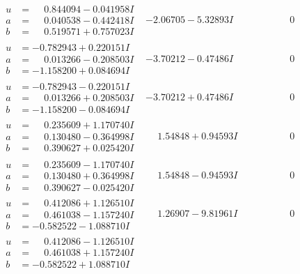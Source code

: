 \documentclass[1p]{elsarticle_modified}
\theoremstyle{definition}
\begin{document}
$$\begin{array}{c|c|c}
\begin{aligned}
u &= \phantom{-}0.844094 - 0.041958 I \\
a &= \phantom{-}0.040538 - 0.442418 I \\
b &= \phantom{-}0.519571 + 0.757023 I\end{aligned}
 & -2.06705 - 5.32893 I & \phantom{-0.000000 } 0 \\ \hline\begin{aligned}
u &= -0.782943 + 0.220151 I \\
a &= \phantom{-}0.013266 - 0.208503 I \\
b &= -1.158200 + 0.084694 I\end{aligned}
 & -3.70212 - 0.47486 I & \phantom{-0.000000 } 0 \\ \hline\begin{aligned}
u &= -0.782943 - 0.220151 I \\
a &= \phantom{-}0.013266 + 0.208503 I \\
b &= -1.158200 - 0.084694 I\end{aligned}
 & -3.70212 + 0.47486 I & \phantom{-0.000000 } 0 \\ \hline\begin{aligned}
u &= \phantom{-}0.235609 + 1.170740 I \\
a &= \phantom{-}0.130480 - 0.364998 I \\
b &= \phantom{-}0.390627 + 0.025420 I\end{aligned}
 & \phantom{-}1.54848 + 0.94593 I & \phantom{-0.000000 } 0 \\ \hline\begin{aligned}
u &= \phantom{-}0.235609 - 1.170740 I \\
a &= \phantom{-}0.130480 + 0.364998 I \\
b &= \phantom{-}0.390627 - 0.025420 I\end{aligned}
 & \phantom{-}1.54848 - 0.94593 I & \phantom{-0.000000 } 0 \\ \hline\begin{aligned}
u &= \phantom{-}0.412086 + 1.126510 I \\
a &= \phantom{-}0.461038 - 1.157240 I \\
b &= -0.582522 - 1.088710 I\end{aligned}
 & \phantom{-}1.26907 - 9.81961 I & \phantom{-0.000000 } 0 \\ \hline\begin{aligned}
u &= \phantom{-}0.412086 - 1.126510 I \\
a &= \phantom{-}0.461038 + 1.157240 I \\
b &= -0.582522 + 1.088710 I\end{aligned}

\end{array}$$
\end{document}
